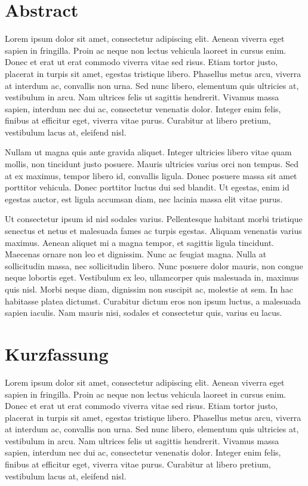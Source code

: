 \chapter*{Abstract}

Lorem ipsum dolor sit amet, consectetur adipiscing elit. Aenean viverra eget sapien in fringilla. Proin ac neque non lectus vehicula laoreet in cursus enim. Donec et erat ut erat commodo viverra vitae sed risus. Etiam tortor justo, placerat in turpis sit amet, egestas tristique libero. Phasellus metus arcu, viverra at interdum ac, convallis non urna. Sed nunc libero, elementum quis ultricies at, vestibulum in arcu. Nam ultrices felis ut sagittis hendrerit. Vivamus massa sapien, interdum nec dui ac, consectetur venenatis dolor. Integer enim felis, finibus at efficitur eget, viverra vitae purus. Curabitur at libero pretium, vestibulum lacus at, eleifend nisl.

Nullam ut magna quis ante gravida aliquet. Integer ultricies libero vitae quam mollis, non tincidunt justo posuere. Mauris ultricies varius orci non tempus. Sed at ex maximus, tempor libero id, convallis ligula. Donec posuere massa sit amet porttitor vehicula. Donec porttitor luctus dui sed blandit. Ut egestas, enim id egestas auctor, est ligula accumsan diam, nec lacinia massa elit vitae purus.

Ut consectetur ipsum id nisl sodales varius. Pellentesque habitant morbi tristique senectus et netus et malesuada fames ac turpis egestas. Aliquam venenatis varius maximus. Aenean aliquet mi a magna tempor, et sagittis ligula tincidunt. Maecenas ornare non leo et dignissim. Nunc ac feugiat magna. Nulla at sollicitudin massa, nec sollicitudin libero. Nunc posuere dolor mauris, non congue neque lobortis eget. Vestibulum ex leo, ullamcorper quis malesuada in, maximus quis nisl. Morbi neque diam, dignissim non suscipit ac, molestie at sem. In hac habitasse platea dictumst. Curabitur dictum eros non ipsum luctus, a malesuada sapien iaculis. Nam mauris nisi, sodales et consectetur quis, varius eu lacus.

\chapter*{Kurzfassung}

Lorem ipsum dolor sit amet, consectetur adipiscing elit. Aenean viverra eget sapien in fringilla. Proin ac neque non lectus vehicula laoreet in cursus enim. Donec et erat ut erat commodo viverra vitae sed risus. Etiam tortor justo, placerat in turpis sit amet, egestas tristique libero. Phasellus metus arcu, viverra at interdum ac, convallis non urna. Sed nunc libero, elementum quis ultricies at, vestibulum in arcu. Nam ultrices felis ut sagittis hendrerit. Vivamus massa sapien, interdum nec dui ac, consectetur venenatis dolor. Integer enim felis, finibus at efficitur eget, viverra vitae purus. Curabitur at libero pretium, vestibulum lacus at, eleifend nisl.

